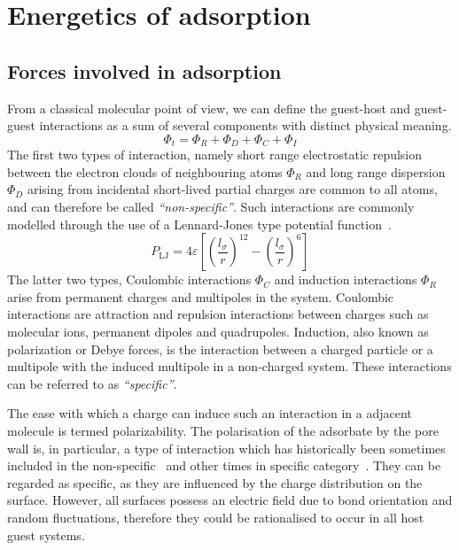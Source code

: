 
\section{Energetics of adsorption}

\subsection{Forces involved in adsorption}\label{calo:forces}

From a classical molecular point of view, we can define the
guest-host and guest-guest interactions as a sum of several
components with distinct physical meaning.
%
\begin{equation}\label{calo:eqn:interactions}
	\Phi_t = \Phi_{R} + \Phi_{D} + \Phi_{C} + \Phi_{I}
\end{equation}
%
The first two types of interaction, namely short range
electrostatic repulsion between the electron clouds of
neighbouring atoms \(\Phi_{R}\) and long range 
dispersion \(\Phi_{D}\) arising from
incidental short-lived partial charges are common to all
atoms, and can therefore be called \textit{``non-specific''}. Such
interactions are commonly modelled through the use of a
Lennard-Jones type potential 
function~\cite{jonesDeterminationMolecularFields1924}.
%
\begin{equation}\label{calo:eqn:lennard-jones}
	P_\text{LJ} = 4\varepsilon \left[ \left(\frac{l_\sigma}{r}\right)^{12} - \left(\frac{l_\sigma}{r}\right)^6 \right]
\end{equation}
%
The latter two types, Coulombic interactions \(\Phi_{C}\) and induction
interactions \(\Phi_{R}\) arise from permanent charges and multipoles in the
system. Coulombic interactions are attraction and repulsion
interactions between charges such as molecular ions, permanent
dipoles and quadrupoles.
Induction, also known as polarization or Debye forces, is the interaction
between a charged particle or a multipole with the induced multipole
in a non-charged system. These interactions can be referred to as
\textit{``specific''}. 

The ease with which a charge can induce such an interaction in a
adjacent molecule is termed polarizability. The polarisation of 
the adsorbate by the pore wall is, in particular, a type of
interaction which has historically been sometimes included in the 
non-specific~\cite{barrerZeolitesClayMinerals1978} and other
times in specific 
category~\cite{coudertComputationalCharacterizationPrediction2016}. 
They can be regarded as specific, as they 
are influenced by the charge distribution on the surface. However,
all surfaces possess an electric field due to bond orientation and
random fluctuations, therefore they could be rationalised to occur
in all host guest systems.

